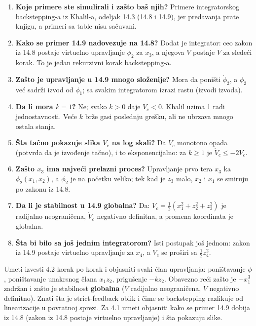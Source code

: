 \documentclass[11pt,a4paper,parskip=half,headsepline,numbers=noenddot]{scrartcl}
\begin{document}
\begin{enumerate}
\def\labelenumi{\arabic{enumi}.}
\item \textbf{Koje primere ste simulirali i zašto baš njih?} Primere integratorskog backstepping-a iz Khalil-a, odeljak 14.3 (14.8 i 14.9), jer predavanja prate knjigu, a primeri sa table nisu sačuvani.
\item \textbf{Kako se primer 14.9 nadovezuje na 14.8?} Dodat je integrator: ceo zakon iz 14.8 postaje virtuelno upravljanje \(\phi_2\) za \(x_3\), a njegova \(V\) postaje \(V\) za sledeći korak. To je jedan rekurzivni korak backstepping-a.
\item \textbf{Zašto je upravljanje u 14.9 mnogo složenije?} Mora da poništi \(\dot\phi_2\), a \(\phi_2\) već sadrži izvod od \(\phi_1\); sa svakim integratorom izrazi rastu (izvodi izvoda).
\item \textbf{Da li mora \(k = 1\)?} Ne; svako \(k > 0\) daje \(\dot V_c < 0\). Khalil uzima 1 radi jednostavnosti. Veće \(k\) brže gasi poslednju grešku, ali ne ubrzava mnogo ostala stanja.
\item \textbf{Šta tačno pokazuje slika \(V_c\) na log skali?} Da \(V_c\) monotono opada (potvrda da je izvođenje tačno), i to eksponencijalno: za \(k \ge 1\) je \(\dot V_c \le -2V_c\).
\item \textbf{Zašto \(x_3\) ima najveći prelazni proces?} Upravljanje prvo tera \(x_3\) ka \(\phi_2(x_1, x_2)\), a \(\phi_2\) je na početku veliko; tek kad je \(z_3\) malo, \(x_2\) i \(x_1\) se smiruju po zakonu iz 14.8.
\item \textbf{Da li je stabilnost u 14.9 globalna?} Da: \(V_c = \frac12(x_1^2 + z_2^2 + z_3^2)\) je radijalno neograničena, \(\dot V_c\) negativno definitna, a promena koordinata je globalna.
\item \textbf{Šta bi bilo sa još jednim integratorom?} Isti postupak još jednom: zakon iz 14.9 postaje virtuelno upravljanje za \(x_4\), a \(V_c\) se proširi sa \(\frac12z_4^2\).
\end{enumerate}

\begin{ispit}
Umeti izvesti 4.2 korak po korak i objasniti svaki član upravljanja: poništavanje \(\dot\phi\), poništavanje unakrsnog člana \(x_1z_2\), prigušenje \(-kz_2\). Obavezno reći zašto je \(-x_1^3\) zadržan i zašto je stabilnost \textbf{globalna} (\(V\) radijalno neograničena, \(\dot V\) negativno definitno). Znati šta je strict-feedback oblik i čime se backstepping razlikuje od linearizacije u povratnoj sprezi. Za 4.1 umeti objasniti kako se primer 14.9 dobija iz 14.8 (zakon iz 14.8 postaje virtuelno upravljanje) i šta pokazuju slike.
\end{ispit}
\end{document}
